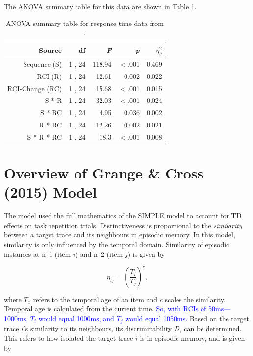 \documentclass[a4paper, man, natbib]{apa6}
\newcommand{\jg}[1]{\textcolor{blue}{$^{\textrm{}}${#1}}}
\begin{document}
The ANOVA summary table for this data are shown in Table \ref{tab:grangeData}.

\begin{table}[htbp]
  \centering
  \caption{ANOVA summary table for response time data from \cite{Grangeinrevision}.}
    \begin{tabular}{rrrrr}
    \toprule
    Source & df    & \emph{F}     & \emph{p}     & $\eta_{g}^{2}$ \\
    \midrule
    Sequence (S) & 1 , 24 & 118.94 & $<$.001 & 0.469 \\
    RCI (R) & 1 , 24 & 12.61 & 0.002 & 0.022 \\
    RCI-Change (RC) & 1 , 24 & 15.68 & $<$.001 & 0.015 \\
    S * R & 1 , 24 & 32.03 & $<$.001 & 0.024 \\
    S * RC & 1 , 24 & 4.95  & 0.036 & 0.002 \\
    R * RC & 1 , 24 & 12.26 & 0.002 & 0.021 \\
    S * R * RC & 1 , 24 & 18.3  & $<$.001 & 0.008 \\
    \bottomrule
    \end{tabular}%
  \label{tab:grangeData}%
\end{table}%



\appendix
\section{Overview of Grange \& Cross (2015) Model}
The \cite{Grange2015} model used the full mathematics of the SIMPLE \citep{Brown2007} model to account for TD effects on task repetition trials. Distinctiveness is proportional to the \emph{similarity} between a target trace and its neighbours in episodic memory. In this model, similarity is only influenced by the temporal domain. Similarity of episodic instances at n--1 (item $i$) and n--2 (item $j$) is given by

\begin{equation}
\eta_{ij} = \left(\frac{T_{i}}{T_{j}}\right)^{c}, 
\label{eq:simpleSimilarity}
\end{equation}

\noindent where $T_{x}$ refers to the temporal age of an item and $c$ scales the similarity. Temporal age is calculated from the current time. \jg{So, with RCIs of 50ms---1000ms, $T_{i}$ would equal 1000ms, and $T_{j}$ would equal 1050ms.} Based on the target trace $i$'s similarity to its neighbours, its discriminability $D_{i}$ can be determined. This refers to how isolated the target trace $i$ is in episodic memory, and is given by
\end{document}
